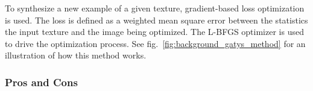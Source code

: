 To synthesize a new example of a given texture, gradient-based loss optimization is used. The loss is defined as a weighted mean square error between the statistics the input texture and the image being optimized. The L-BFGS optimizer is used to drive the optimization process. See fig.~\ref{fig:background_gatys_method} for an illustration of how this method works.

\subsubsection{Pros and Cons}
\label{section:background-texture_synthesis-statistics_based-pros_and_cons}

\begin{figure}[h]
    \centering
    \begin{subfigure}[b]{\textwidth}
        \centering
    \end{subfigure}
    
    \begin{subfigure}[b]{\textwidth}
        \centering
    \end{subfigure}
    
    \begin{subfigure}[b]{\textwidth}
        \centering
    \end{subfigure}


\end{figure}

